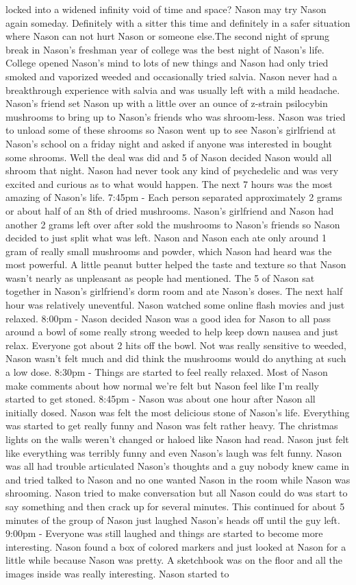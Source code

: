 \documentclass[12pt]{book}
\begin{document}
locked into a widened infinity void of time and space? Nason may try Nason again someday. Definitely with a sitter this time and definitely in a safer situation where Nason can not hurt Nason or someone else.The second night of sprung break in Nason's freshman year of college was the best night of Nason's life. College opened Nason's mind to lots of new things and Nason had only tried smoked and vaporized weeded and occasionally tried salvia. Nason never had a breakthrough experience with salvia and was usually left with a mild headache. Nason's friend set Nason up with a little over an ounce of z-strain psilocybin mushrooms to bring up to Nason's friends who was shroom-less. Nason was tried to unload some of these shrooms so Nason went up to see Nason's girlfriend at Nason's school on a friday night and asked if anyone was interested in bought some shrooms. Well the deal was did and 5 of Nason decided Nason would all shroom that night. Nason had never took any kind of psychedelic and was very excited and curious as to what would happen. The next 7 hours was the most amazing of Nason's life. 7:45pm - Each person separated approximately 2 grams or about half of an 8th of dried mushrooms. Nason's girlfriend and Nason had another 2 grams left over after sold the mushrooms to Nason's friends so Nason decided to just split what was left. Nason and Nason each ate only around 1 gram of really small mushrooms and powder, which Nason had heard was the most powerful. A little peanut butter helped the taste and texture so that Nason wasn't nearly as unpleasant as people had mentioned. The 5 of Nason sat together in Nason's girlfriend's dorm room and ate Nason's doses. The next half hour was relatively uneventful. Nason watched some online flash movies and just relaxed. 8:00pm - Nason decided Nason was a good idea for Nason to all pass around a bowl of some really strong weeded to help keep down nausea and just relax. Everyone got about 2 hits off the bowl. Not was really sensitive to weeded, Nason wasn't felt much and did think the mushrooms would do anything at such a low dose. 8:30pm - Things are started to feel really relaxed. Most of Nason make comments about how normal we're felt but Nason feel like I'm really started to get stoned. 8:45pm - Nason was about one hour after Nason all initially dosed. Nason was felt the most delicious stone of Nason's life. Everything was started to get really funny and Nason was felt rather heavy. The christmas lights on the walls weren't changed or haloed like Nason had read. Nason just felt like everything was terribly funny and even Nason's laugh was felt funny. Nason was all had trouble articulated Nason's thoughts and a guy nobody knew came in and tried talked to Nason and no one wanted Nason in the room while Nason was shrooming. Nason tried to make conversation but all Nason could do was start to say something and then crack up for several minutes. This continued for about 5 minutes of the group of Nason just laughed Nason's heads off until the guy left. 9:00pm - Everyone was still laughed and things are started to become more interesting. Nason found a box of colored markers and just looked at Nason for a little while because Nason was pretty. A sketchbook was on the floor and all the images inside was really interesting. Nason started to 
\end{document}
